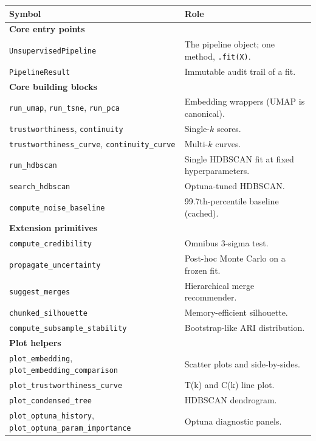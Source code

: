 \documentclass[11pt,a4paper]{article}
\begin{document}
\begin{table}[h]
  \centering
  \footnotesize
  \begin{tabular}{p{} p{}}
    \toprule
    Symbol & Role \\
    \midrule
    \multicolumn{2}{l}{\textbf{Core entry points}} \\
    \texttt{UnsupervisedPipeline} & The pipeline object; one method, \texttt{.fit(X)}. \\
    \texttt{PipelineResult} & Immutable audit trail of a fit. \\
    \midrule
    \multicolumn{2}{l}{\textbf{Core building blocks}} \\
    \texttt{run\_umap}, \texttt{run\_tsne}, \texttt{run\_pca} & Embedding wrappers (UMAP is canonical). \\
    \texttt{trustworthiness}, \texttt{continuity} & Single-\(k\) scores. \\
    \texttt{trustworthiness\_curve}, \texttt{continuity\_curve} & Multi-\(k\) curves. \\
    \texttt{run\_hdbscan} & Single HDBSCAN fit at fixed hyperparameters. \\
    \texttt{search\_hdbscan} & Optuna-tuned HDBSCAN. \\
    \texttt{compute\_noise\_baseline} & 99.7th-percentile baseline (cached). \\
    \midrule
    \multicolumn{2}{l}{\textbf{Extension primitives}} \\
    \texttt{compute\_credibility} & Omnibus 3-sigma test. \\
    \texttt{propagate\_uncertainty} & Post-hoc Monte Carlo on a frozen fit. \\
    \texttt{suggest\_merges} & Hierarchical merge recommender. \\
    \texttt{chunked\_silhouette} & Memory-efficient silhouette. \\
    \texttt{compute\_subsample\_stability} & Bootstrap-like ARI distribution. \\
    \midrule
    \multicolumn{2}{l}{\textbf{Plot helpers}} \\
    \texttt{plot\_embedding}, \texttt{plot\_embedding\_comparison} & Scatter plots and side-by-sides. \\
    \texttt{plot\_trustworthiness\_curve} & T(k) and C(k) line plot. \\
    \texttt{plot\_condensed\_tree} & HDBSCAN dendrogram. \\
    \texttt{plot\_optuna\_history}, \texttt{plot\_optuna\_param\_importance} & Optuna diagnostic panels. \\

\end{tabular}
\end{table}
\end{document}

